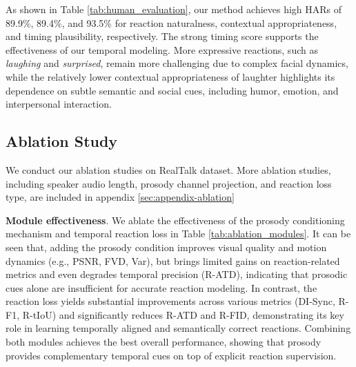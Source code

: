 
As shown in Table \ref{tab:human_evaluation}, our method achieves high HARs of 89.9\%, 89.4\%, and 93.5\% for reaction naturalness, contextual appropriateness, and timing plausibility, respectively. The strong timing score supports the effectiveness of our temporal modeling. More expressive reactions, such as \textit{laughing} and \textit{surprised}, remain more challenging due to complex facial dynamics, while the relatively lower contextual appropriateness of laughter highlights its dependence on subtle semantic and social cues, including humor, emotion, and interpersonal interaction.




\vspace{-0.5em}
\subsection{Ablation Study}
\vspace{-0.5em}

We conduct our ablation studies on RealTalk dataset. More ablation studies, including speaker audio length, prosody channel projection, and reaction loss type, are included in appendix \ref{sec:appendix-ablation}

\textbf{Module effectiveness}. 
We ablate the effectiveness of the prosody conditioning mechanism and temporal reaction loss in Table \ref{tab:ablation_modules}. It can be seen that, adding the prosody condition improves visual quality and motion dynamics (e.g., PSNR, FVD, Var), but brings limited gains on reaction-related metrics and even degrades temporal precision (R-ATD), indicating that prosodic cues alone are insufficient for accurate reaction modeling. 
In contrast, the reaction loss yields substantial improvements across various metrics (DI-Sync, R-F1, R-tIoU) and significantly reduces R-ATD and R-FID, demonstrating its key role in learning temporally aligned and semantically correct reactions. Combining both modules achieves the best overall performance, showing that prosody provides complementary temporal cues on top of explicit reaction supervision.

